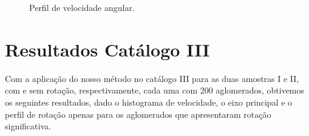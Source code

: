 \begin{anexosenv}
\begin{figure}[H]
\caption{Perfil de velocidade angular.}
\label{fig:fig6}%
\end{figure}


\chapter{Resultados Catálogo III}
\label{chap:anexoiii}

Com a aplicação do nosso método no catálogo III para as duas amostras I e II, com e sem rotação, respectivamente, cada uma com 200 aglomerados, obtivemos os seguintes resultados, dado o histograma de velocidade, o eixo principal e o perfil de rotação apenas para os aglomerados que apresentaram rotação significativa.  


\end{anexosenv}
